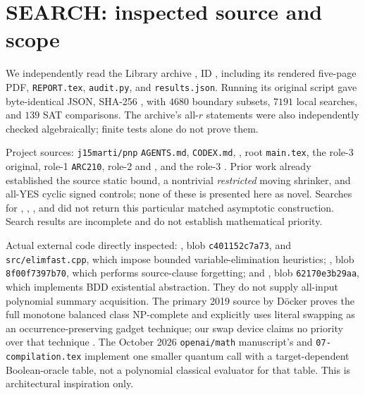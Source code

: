 \documentclass[11pt]{article}
\begin{document}
\section{SEARCH: inspected source and scope}
We independently read the Library archive , ID , including its rendered five-page PDF, \texttt{REPORT.tex}, \texttt{audit.py}, and \texttt{results.json}. Running its original script gave byte-identical JSON, SHA-256 , with $4680$ boundary subsets, $7191$ local searches, and $139$ SAT comparisons. The archive's all-$r$ statements were also independently checked algebraically; finite tests alone do not prove them.

Project sources: \texttt{j15marti/pnp} \texttt{AGENTS.md}, \texttt{CODEX.md}, , root \texttt{main.tex}, the role-3  original, role-1 \texttt{ARC210}, role-2  and , and the role-3 . Prior work already established the source static bound, a nontrivial \emph{restricted} moving shrinker, and all-YES cyclic signed controls; none of these is presented here as novel. Searches for , , , and  did not return this particular matched asymptotic construction. Search results are incomplete and do not establish mathematical priority.

Actual external code directly inspected: , blob \texttt{c401152c7a73}, and \texttt{src/elimfast.cpp}, which impose bounded variable-elimination heuristics; , blob \texttt{8f00f7397b70}, which performs source-clause forgetting; and , blob \texttt{62170e3b29aa}, which implements BDD existential abstraction. They do not supply all-input polynomial summary acquisition. The primary 2019 source by D\"ocker proves the full monotone balanced class NP-complete and explicitly uses literal swapping as an occurrence-preserving gadget technique; our swap device claims no priority over that technique \cite{docker}. The October 2026 \texttt{openai/math} manuscript's  and \texttt{07-compilation.tex} implement one smaller quantum call with a target-dependent Boolean-oracle table, not a polynomial classical evaluator for that table. This is architectural inspiration only.
\end{document}
